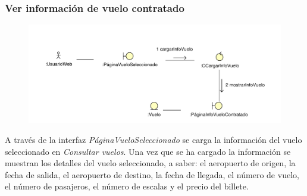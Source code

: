 \documentclass[11pt, a4paper, twoside, titlepage]{article}
\begin{document}
			\subsubsection{Ver información de vuelo contratado}
				\begin{figure}[H]\centering
					\includegraphics[scale=.8]{diagramas/verinfovuelocontratado.pdf}
				\end{figure}
					A través de la interfaz {\itshape PáginaVueloSeleccionado} se carga la información del vuelo seleccionado en  {\itshape Consultar vuelos}. Una vez que se ha cargado la información se muestran los detalles del vuelo seleccionado, a saber: el aeropuerto de origen, la fecha de salida, el aeropuerto de destino, la fecha de llegada, el número de vuelo, el número de pasajeros, el número de escalas y el precio del billete.
\end{document}
